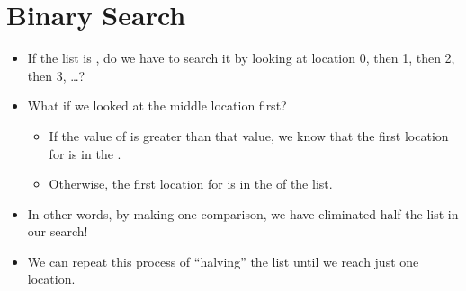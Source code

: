 \documentclass[letterpaper,10pt,english]{sphinxmanual}
\begin{document}
\section{Binary Search}
\label{\detokenize{lecture_notes/lec20_searching:binary-search}}\begin{itemize}
\item {} 
If the list is , do we have to search it by looking at
location 0, then 1, then 2, then 3, …?

\item {} 
What if we looked at the middle location first?
\begin{itemize}
\item {} 
If the value of  is greater than that value, we know that the
first location for  is in the .

\item {} 
Otherwise, the first location for  is in the 
of the list.

\end{itemize}

\item {} 
In other words, by making one comparison, we have eliminated half the
list in our search!

\item {} 
We can repeat this process of “halving” the list until we reach just
one location.

\end{itemize}
\end{document}

